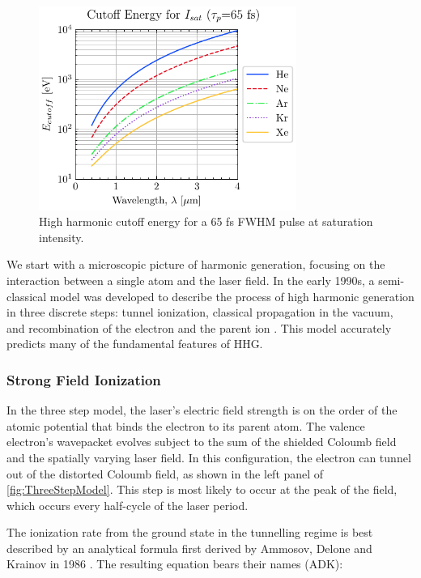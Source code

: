 \begin{figure}
	\centering
	\includegraphics[width=0.75\textwidth]{figures/chap1/saturation_intensity_cutoff.pdf}
	\caption{High harmonic cutoff energy for a 65 fs FWHM pulse at saturation intensity.}
	\label{fig:saturation_intensity_cutoff}
\end{figure}


We start with a microscopic picture of harmonic generation, focusing on the interaction between a single atom and the laser field. In the early 1990s, a semi-classical model was developed to describe the process of high harmonic generation in three discrete steps: tunnel ionization, classical propagation in the vacuum, and recombination of the electron and the parent ion \cite{schaferThresholdIonizationHigh1993,corkumPlasmaPerspectiveStrong1993}. This model accurately predicts many of the fundamental features of HHG.

\subsubsection{Strong Field Ionization}

In the three step model, the laser's electric field strength is on the order of the atomic potential that binds the electron to its parent atom. The valence electron's wavepacket evolves subject to the sum of the shielded Coloumb field and the spatially varying laser field. In this configuration, the electron can tunnel out of the distorted Coloumb field, as shown in the left panel of \cref{fig:ThreeStepModel}. This step is most likely to occur at the peak of the field, which occurs every half-cycle of the laser period.

The ionization rate from the ground state in the tunnelling regime is best described by an analytical formula first derived by Ammosov, Delone and Krainov in 1986 \cite{ammosovTunnelIonizationComplex1986,changFundamentalsAttosecondOptics2011,laiExperimentalInvestigationStrongfieldionization2017}. The resulting equation bears their names (ADK):

